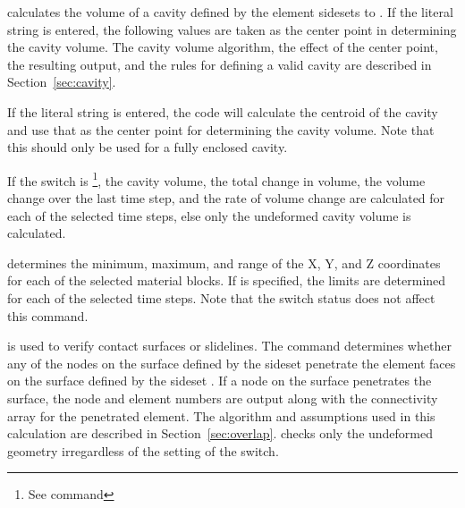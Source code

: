  {
 calculates the volume of a cavity defined by the element
sidesets  to .  If the literal string
 is entered, the following values are taken as the
center point in determining the cavity volume. The cavity volume
algorithm, the effect of the center point, the resulting output, and the
rules for defining a valid cavity are described in
Section~\ref{sec:cavity}. 

If the literal string  is entered, the code will
calculate the centroid of the cavity and use that as the center point
for determining the cavity volume. Note that this should only be used
for a fully enclosed cavity.

If the  switch is \footnote{See command
}, the cavity volume, the total change in volume, the volume
change over the last time step, and the rate of volume change are
calculated for each of the selected time steps, else only the undeformed
cavity volume is calculated. 
}

 {
 determines the minimum, maximum, and range of the 
X, Y, and Z coordinates for each of the selected material blocks.
If  is specified, the limits are determined for each of
the selected time steps.  Note that the  switch status does
not affect this command.
}

 {
 is used to verify contact surfaces or slidelines.  The
command determines whether any of the nodes on the surface defined by
the sideset  penetrate the element faces on the surface
defined by the sideset .  If a node on the
 surface penetrates the  surface, the
node and element numbers are output along with the connectivity array
for the penetrated element. The algorithm and assumptions used in this
calculation are described in Section~\ref{sec:overlap}.  
checks only the undeformed geometry irregardless of the setting of the
 switch. 
}

